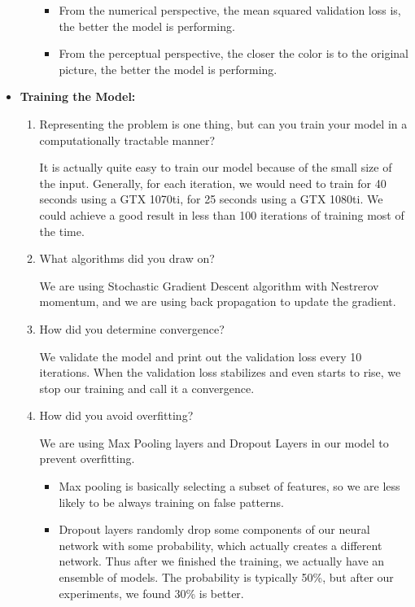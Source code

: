 \documentclass[letter]{article}
\begin{document}
\begin{itemize}
\begin{enumerate}
		\begin{itemize}
			\item {From the numerical perspective, the mean squared validation loss is, the better the model is performing. }
			\item {From the perceptual perspective, the closer the color is to the original picture, the better the model is performing.}
		\end{itemize}
	\end{enumerate}
	\item {\textbf{Training the Model:}} 
	\begin{enumerate}
		\item{Representing the problem is one thing, but can you train your model in a computationally tractable manner?}
		\par{It is actually quite easy to train our model because of the small size of the input. Generally, for each iteration, we would need to train for 40 seconds using a GTX 1070ti, for 25 seconds using a GTX 1080ti. We could achieve a good result in less than 100 iterations of training most of the time.}
		\item{What algorithms did you draw on?}
		\par{We are using Stochastic Gradient Descent algorithm with Nestrerov momentum, and we are using back propagation to update the gradient.}
		\item{How did you determine convergence?}
		\par{We validate the model and print out the validation loss every 10 iterations. When the validation loss stabilizes and even starts to rise, we stop our training and call it a convergence.}
		\item{How did you avoid overfitting?}
		\par{We are using Max Pooling layers and Dropout Layers in our model to prevent overfitting.}
		\begin{itemize}
			\item {Max pooling is basically selecting a subset of features, so we are less likely to be always training on false patterns.}
			\item {Dropout layers randomly drop some components of our neural network with some probability, which actually creates a different network. Thus after we finished the training, we actually have an ensemble of models. The probability is typically 50\%, but after our experiments, we found 30\% is better.}
		\end{itemize}
	\end{enumerate}

\end{itemize}
\end{document}
